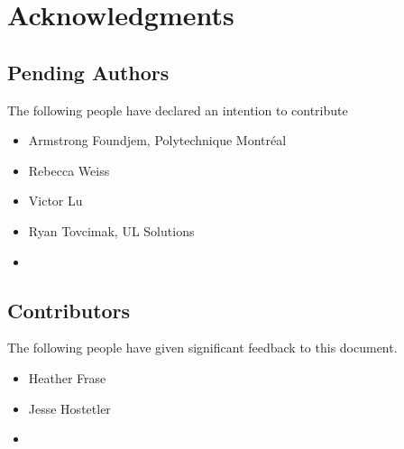 \documentclass{article}
\begin{document}
\section{Acknowledgments}
\subsection{Pending Authors}
The following people have declared an intention to contribute
\begin{itemize}
\item Armstrong Foundjem, Polytechnique Montréal 
\item Rebecca Weiss
\item Victor Lu
\item Ryan Tovcimak, UL Solutions
\item <Your name here>
\end{itemize}
\subsection{Contributors}
The following people have given significant feedback to this document.
\begin{itemize}
\item Heather Frase
\item Jesse Hostetler
\item <Your name here>
\end{itemize}




\appendix 




\end{document}

